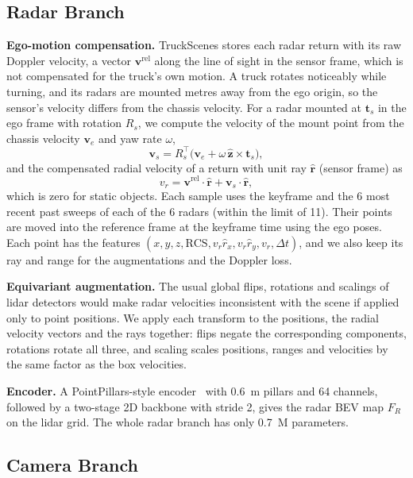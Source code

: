 \documentclass[conference]{IEEEtran}
\newcommand{\vect}[1]{\mathbf{#1}}
\begin{document}
\subsection{Radar Branch}

\textbf{Ego-motion compensation.} TruckScenes stores each radar return with its raw Doppler velocity, a vector
$\vect{v}^{\mathrm{rel}}$ along the line of sight in the sensor frame, which is not compensated for the truck's own
motion. A truck rotates noticeably while turning, and its radars are mounted metres away from the ego origin, so the
sensor's velocity differs from the chassis velocity. For a radar mounted at $\vect{t}_s$ in the ego frame with
rotation $R_s$, we compute the velocity of the mount point from the chassis velocity $\vect{v}_e$ and yaw rate
$\omega$,
\begin{equation}
\vect{v}_s = R_s^{\top}\big(\vect{v}_e + \omega\,\hat{\vect{z}} \times \vect{t}_s\big),
\end{equation}
and the compensated radial velocity of a return with unit ray $\hat{\vect{r}}$ (sensor frame) as
\begin{equation}
v_r = \vect{v}^{\mathrm{rel}} \cdot \hat{\vect{r}} + \vect{v}_s \cdot \hat{\vect{r}},
\end{equation}
which is zero for static objects. Each sample uses the keyframe and the 6 most recent past sweeps of each of the
6 radars (within the limit of 11). Their points are moved into the reference frame at the keyframe time using the
ego poses. Each point has the features $(x, y, z, \mathrm{RCS}, v_r \hat{r}_x, v_r \hat{r}_y, v_r, \Delta t)$, and we
also keep its ray and range for the augmentations and the Doppler loss.

\textbf{Equivariant augmentation.} The usual global flips, rotations and scalings of lidar detectors would make radar
velocities inconsistent with the scene if applied only to point positions. We apply each transform to the positions,
the radial velocity vectors and the rays together: flips negate the corresponding components, rotations rotate all
three, and scaling scales positions, ranges and velocities by the same factor as the box velocities.

\textbf{Encoder.} A PointPillars-style encoder~\cite{lang2019pointpillars} with 0.6~m pillars and 64 channels,
followed by a two-stage 2D backbone with stride 2, gives the radar BEV map $F_R$ on the lidar grid. The whole radar
branch has only 0.7~M parameters.

\subsection{Camera Branch}
\end{document}
